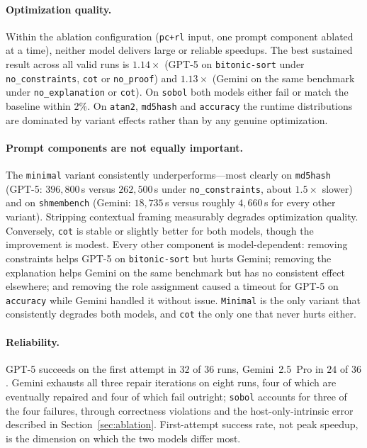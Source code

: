 \paragraph{Optimization quality.}
Within the ablation configuration (\texttt{pc+rl} input, one prompt component ablated at a time),
neither model delivers large or reliable speedups. The best sustained result across all valid runs is
$1.14\times$ (GPT-5 on \texttt{bitonic-sort} under \texttt{no\_constraints}, \texttt{cot} or
\texttt{no\_proof}) and $1.13\times$ (Gemini on the same benchmark under \texttt{no\_explanation} or
\texttt{cot}). On \texttt{sobol} both models either fail or match the baseline within $2\%$. On
\texttt{atan2}, \texttt{md5hash} and \texttt{accuracy} the runtime distributions are dominated by
variant effects rather than by any genuine optimization.

\paragraph{Prompt components are not equally important.}
The \texttt{minimal} variant consistently underperforms---most clearly on \texttt{md5hash}
(GPT-5: $396{,}800$\,\textmu s versus $262{,}500$\,\textmu s under \texttt{no\_constraints}, about
$1.5\times$ slower) and on \texttt{shmembench} (Gemini: $18{,}735$\,\textmu s versus roughly
$4{,}660$\,\textmu s for every other variant). Stripping contextual framing measurably degrades
optimization quality. Conversely, \texttt{cot} is stable or slightly better for both models, though the
improvement is modest. Every other component is model-dependent: removing constraints helps GPT-5 on
\texttt{bitonic-sort} but hurts Gemini; removing the explanation helps Gemini on the same benchmark but
has no consistent effect elsewhere; and removing the role assignment caused a timeout for GPT-5 on
\texttt{accuracy} while Gemini handled it without issue. \texttt{Minimal} is the only variant that
consistently degrades both models, and \texttt{cot} the only one that never hurts either.

\paragraph{Reliability.}
GPT-5 succeeds on the first attempt in $32$ of $36$ runs, Gemini~2.5~Pro in $24$ of $36$. Gemini
exhausts all three repair iterations on eight runs, four of which are eventually repaired and four of
which fail outright; \texttt{sobol} accounts for three of the four failures, through correctness
violations and the host-only-intrinsic error described in Section~\ref{sec:ablation}. First-attempt
success rate, not peak speedup, is the dimension on which the two models differ most.

